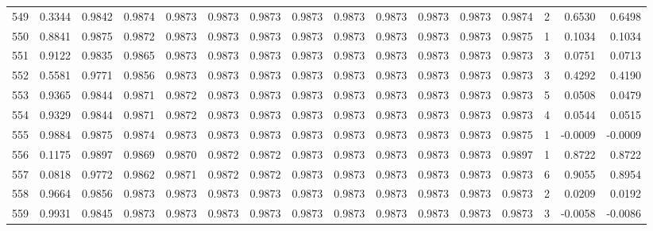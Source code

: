 \begin{tabular}{lrrrrrrrrrrrrrrr}
549 &      0.3344 &  0.9842 &  0.9874 &  0.9873 &  0.9873 &  0.9873 &  0.9873 &  0.9873 &  0.9873 &  0.9873 &   0.9873 &     0.9874 &      2 &                    0.6530 &                     0.6498 \\
550 &      0.8841 &  0.9875 &  0.9872 &  0.9873 &  0.9873 &  0.9873 &  0.9873 &  0.9873 &  0.9873 &  0.9873 &   0.9873 &     0.9875 &      1 &                    0.1034 &                     0.1034 \\
551 &      0.9122 &  0.9835 &  0.9865 &  0.9873 &  0.9873 &  0.9873 &  0.9873 &  0.9873 &  0.9873 &  0.9873 &   0.9873 &     0.9873 &      3 &                    0.0751 &                     0.0713 \\
552 &      0.5581 &  0.9771 &  0.9856 &  0.9873 &  0.9873 &  0.9873 &  0.9873 &  0.9873 &  0.9873 &  0.9873 &   0.9873 &     0.9873 &      3 &                    0.4292 &                     0.4190 \\
553 &      0.9365 &  0.9844 &  0.9871 &  0.9872 &  0.9873 &  0.9873 &  0.9873 &  0.9873 &  0.9873 &  0.9873 &   0.9873 &     0.9873 &      5 &                    0.0508 &                     0.0479 \\
554 &      0.9329 &  0.9844 &  0.9871 &  0.9872 &  0.9873 &  0.9873 &  0.9873 &  0.9873 &  0.9873 &  0.9873 &   0.9873 &     0.9873 &      4 &                    0.0544 &                     0.0515 \\
555 &      0.9884 &  0.9875 &  0.9874 &  0.9873 &  0.9873 &  0.9873 &  0.9873 &  0.9873 &  0.9873 &  0.9873 &   0.9873 &     0.9875 &      1 &                   -0.0009 &                    -0.0009 \\
556 &      0.1175 &  0.9897 &  0.9869 &  0.9870 &  0.9872 &  0.9872 &  0.9873 &  0.9873 &  0.9873 &  0.9873 &   0.9873 &     0.9897 &      1 &                    0.8722 &                     0.8722 \\
557 &      0.0818 &  0.9772 &  0.9862 &  0.9871 &  0.9872 &  0.9872 &  0.9873 &  0.9873 &  0.9873 &  0.9873 &   0.9873 &     0.9873 &      6 &                    0.9055 &                     0.8954 \\
558 &      0.9664 &  0.9856 &  0.9873 &  0.9873 &  0.9873 &  0.9873 &  0.9873 &  0.9873 &  0.9873 &  0.9873 &   0.9873 &     0.9873 &      2 &                    0.0209 &                     0.0192 \\
559 &      0.9931 &  0.9845 &  0.9873 &  0.9873 &  0.9873 &  0.9873 &  0.9873 &  0.9873 &  0.9873 &  0.9873 &   0.9873 &     0.9873 &      3 &                   -0.0058 &                    -0.0086 \\

\end{tabular}
